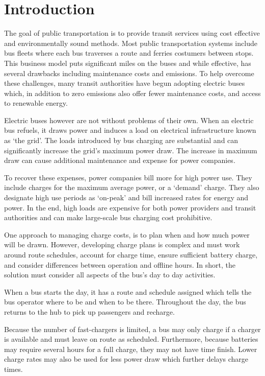 \section{Introduction}
The goal of public transportation is to provide transit services using cost effective and environmentally sound methods. Most public transportation systems include bus fleets where each bus traverses a route and ferries costumers between stops. This business model puts significant miles on the buses and while effective, has several drawbacks including maintenance costs and emissions. To help overcome these challenges, many transit authorities have begun adopting electric buses which, in addition to zero emissions also offer fewer maintenance costs, and access to renewable energy\cite{poornesh_comparative_2020}.
\par Electric buses however are not without problems of their own. When an electric bus refuels, it draws power and induces a load on electrical infrastructure known as `the grid'. The loads introduced by bus charging are substantial and can significantly increase the grid's maximum power draw\cite{stahleder_impact_2019}\cite{deb_impact_2017}\cite{boonraksa_impact_2019}. The increase in maximum draw can cause additional maintenance and expense for power companies. 
\par To recover these expenses, power companies bill more for high power use.  They include charges for the maximum average power, or a `demand' charge.  They also designate high use periods as `on-peak' and bill increased rates for energy and power. In the end, high loads are expensive for both power providers and transit authorities and can make large-scale bus charging cost prohibitive. 
\par One approach to managing charge costs, is to plan when and how much power will be drawn.  However, developing charge plans is complex and must work around route schedules, account for charge time, ensure sufficient battery charge, and consider differences between operation and offline hours.  In short, the solution must consider all aspects of the bus's day to day activities.
\par When a bus starts the day, it has a route and schedule assigned which tells the bus operator where to be and when to be there. Throughout the day, the bus returns to the hub to pick up passengers and recharge. 
\par Because the number of fast-chargers is limited, a bus may only charge if a charger is available and must leave on route as scheduled. Furthermore, because batteries may require several hours for a full charge, they may not have time finish. Lower charge rates may also be used for less power draw which further delays charge times. 

